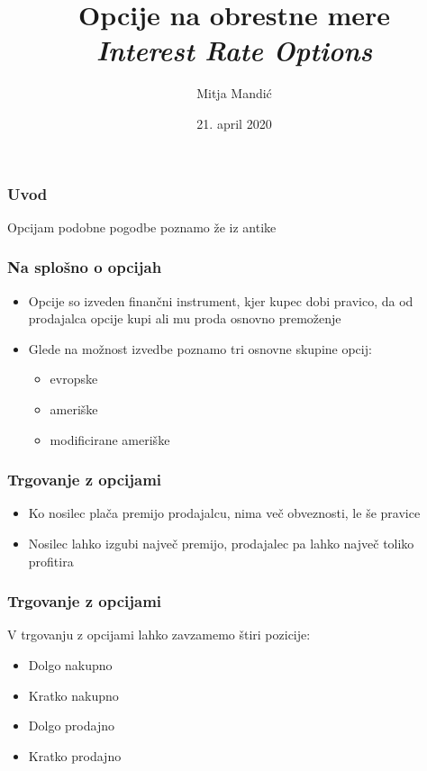 \documentclass[14pt]{beamer}
\begin{document}
\title{Opcije na obrestne mere \\ \textit{Interest Rate Options}}
\author{Mitja Mandić}
\date{21. april 2020}

\begin{frame}
    \titlepage
\end{frame}

\begin{frame}
    \frametitle{Uvod}
    Opcijam podobne pogodbe poznamo že iz antike
\end{frame}

\begin{frame}
    \frametitle{Na splošno o opcijah}
    \begin{itemize}
        \item Opcije so izveden finančni instrument, kjer kupec dobi pravico, da od prodajalca opcije kupi 
        ali mu proda osnovno premoženje
        \item Glede na možnost izvedbe poznamo tri osnovne skupine opcij:
        \begin{itemize}
            \item evropske
            \pause
            \item ameriške
            \pause
            \item modificirane ameriške
        \end{itemize}
    \end{itemize}
\end{frame}

\begin{frame}
    \frametitle{Trgovanje z opcijami}
    \begin{itemize}
        \item Ko nosilec plača premijo prodajalcu, nima več obveznosti, le še pravice
        \item Nosilec lahko izgubi največ premijo, prodajalec pa lahko največ toliko profitira
    \end{itemize}
\end{frame}

\begin{frame}
    \frametitle{Trgovanje z opcijami}
    V trgovanju z opcijami lahko zavzamemo štiri pozicije:
    \begin{itemize}
        \item Dolgo nakupno
        \item Kratko nakupno
        \item Dolgo prodajno
        \item Kratko prodajno
    \end{itemize}
\end{frame}
\end{document}
